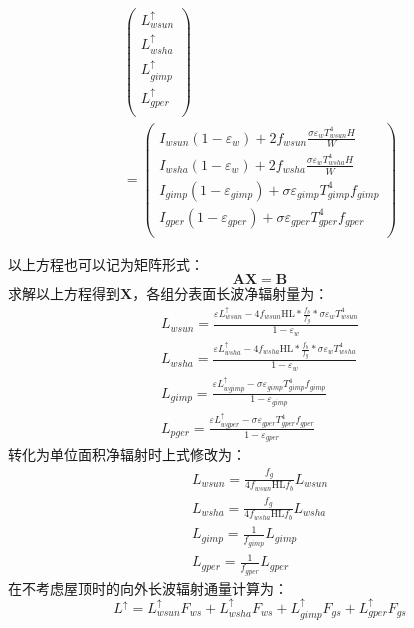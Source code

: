 \begin{landscape}
\begin{equation}
\begin{aligned}
\left(\begin{matrix}L_{wsun}^\uparrow\\L_{wsha}^\uparrow\\L_{gimp}^\uparrow\\L_{gper}^\uparrow\\\end{matrix}\right)\\
=\left(\begin{matrix}I_{wsun}\left(1-\varepsilon_w\right)+2f_{wsun}\frac{\sigma\varepsilon_wT_{wsun}^4H}{W}\\I_{wsha}\left(1-\varepsilon_w\right)+2f_{wsha}\frac{\sigma\varepsilon_wT_{wsha}^4H}{W}\\I_{gimp}\left(1-\varepsilon_{gimp}\right)+\sigma\varepsilon_{gimp}T_{gimp}^4f_{gimp}\\I_{gper}\left(1-\varepsilon_{gper}\right)+\sigma\varepsilon_{gper}T_{gper}^4f_{gper}\\\end{matrix}\right)
\end{aligned}
\end{equation}
\end{landscape}

以上方程也可以记为矩阵形式：
\begin{equation}
\mathbf{A X}=\mathbf{B}
\end{equation}
求解以上方程得到$\mathbf{X}$，各组分表面长波净辐射量为：
\begin{equation}\label{L_wsun_wsha_gimp_pger_1}
\begin{array}{c}L_{wsun}=\frac{\varepsilon L_{wsun}^{\uparrow}-4 f_{wsun} \mathrm{HL} * \frac{f_{b}}{f_{g}} * \sigma \varepsilon_{w} T_{wsun}^{4}}{1-\varepsilon_{w}} \\ L_{wsha}=\frac{\varepsilon L_{wsha}^{\uparrow}-4 f_{wsha} \mathrm{HL} * \frac{f_{b}}{f_{g}} * \sigma \varepsilon_{w} T_{wsha}^{4}}{1-\varepsilon_{w}} \\ L_{gimp}=\frac{\varepsilon L_{w gimp}^{\uparrow}-\sigma \varepsilon_{gimp} T_{gimp}^{4} f_{gimp}}{1-\varepsilon_{gimp}} \\ L_{p g e r}=\frac{\varepsilon L_{w gper}^{\uparrow}-\sigma \varepsilon_{gper} T_{gper}^{4} f_{gper}}{1-\varepsilon_{gper}}\end{array}
\end{equation}
转化为单位面积净辐射时上式修改为：
\begin{equation}\label{L_wsun_wsha_gimp_pger_2}
\begin{array}{c}L_{wsun}=\frac{f_{g}}{4 f_{wsun} \mathrm{HL} f_{b}} L_{wsun} \\ L_{wsha}=\frac{f_{g}}{4 f_{wsha} \mathrm{HL} f_{b}} L_{wsha} \\ L_{gimp}=\frac{1}{f_{gimp}} L_{gimp} \\ L_{gper}=\frac{1}{f_{gper}} L_{gper}\end{array}
\end{equation}
在不考虑屋顶时的向外长波辐射通量计算为：
\begin{equation}
L^{\uparrow}=L_{wsun}^{\uparrow} F_{ws}+L_{wsha}^{\uparrow} F_{ws}+L_{gimp}^{\uparrow} F_{gs}+L_{gper}^{\uparrow} F_{gs}
\end{equation}

